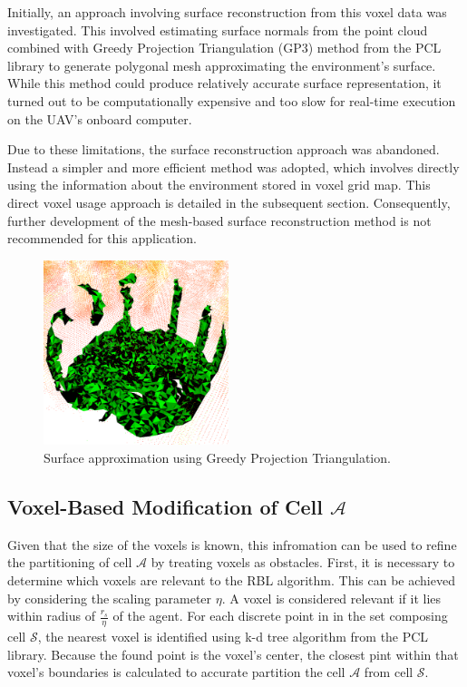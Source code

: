             Initially, an approach involving surface reconstruction from this voxel data was investigated. 
            This involved estimating surface normals from the point cloud combined with Greedy Projection Triangulation (GP3) method from the PCL library to generate polygonal mesh approximating the environment's surface.
            While this method could produce relatively accurate surface representation, it turned out to be computationally expensive and too slow for real-time execution on the \ac{UAV}'s onboard computer.

            Due to these limitations, the surface reconstruction approach was abandoned. 
            Instead a simpler and more efficient method was adopted, which involves directly using the information about the environment stored in voxel grid map.
            This direct voxel usage approach is detailed in the subsequent section. 
            Consequently, further development of the mesh-based surface reconstruction method is not recommended for this application.

            \begin{figure}[H]
                \centering
                \includegraphics[width=0.48\textwidth]{./fig/rviz/triangulation_surface_aprox.png}
                \caption{
                    Surface approximation using Greedy Projection Triangulation.
                }
                \label{fig:triangulation}
            \end{figure}

        \subsection{Voxel-Based Modification of Cell $\mathcal{A}$}
            Given that the size of the voxels is known, this infromation can be used to refine the partitioning of cell $\mathcal{A}$ by treating voxels as obstacles.
            First, it is necessary to determine which voxels are relevant to the \ac{RBL} algorithm.
            This can be achieved by considering the scaling parameter $\eta$.
            A voxel is considered relevant if it lies within radius of $\frac{r_s}{\eta}$ of the agent.
            For each discrete point in  in the set composing cell $\mathcal{S}$, the nearest voxel is identified using k-d tree algorithm from the PCL library.
            Because the found point is the voxel's center, the closest pint within that voxel's boundaries is calculated to accurate partition the cell $\mathcal{A}$ from cell $\mathcal{S}$.

